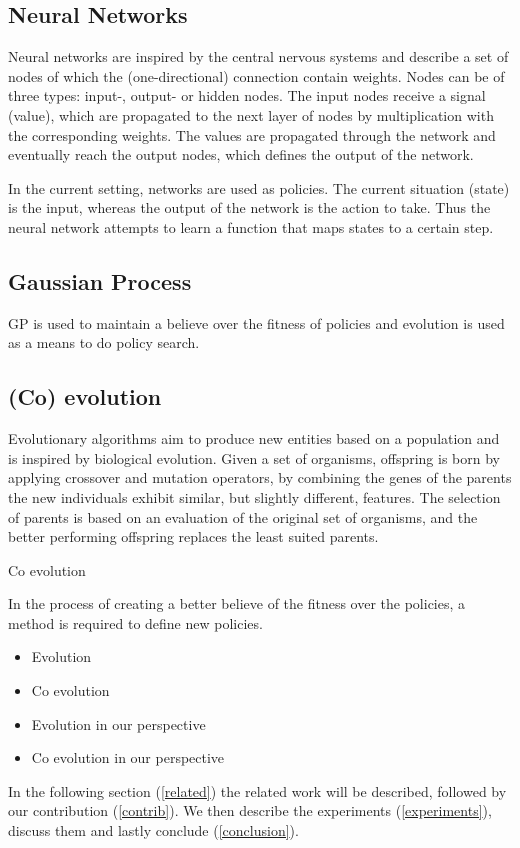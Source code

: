 \subsection{Neural Networks}
Neural networks are inspired by the central nervous systems and describe a set of nodes of which the (one-directional) connection contain weights. Nodes can be of three types: input-, output- or hidden nodes. The input nodes receive a signal (value), which are propagated to the next layer of nodes by multiplication with the corresponding weights. The values are propagated through the network and eventually reach the output nodes, which defines the output of the network. 

In the current setting, networks are used as policies. The current situation (state) is the input, whereas the output of the network is the action to take. Thus the neural network attempts to learn a function that maps states to a certain step.

\subsection{Gaussian Process}

GP is used to maintain a believe over the fitness of policies and evolution is used as a means to do policy search.

\subsection{(Co) evolution}
Evolutionary algorithms aim to produce new entities based on a population and is inspired by biological evolution. Given a set of organisms, offspring is born by applying crossover and mutation operators, by combining the genes of the parents the new individuals exhibit similar, but slightly different, features. The selection of parents is based on an evaluation of the original set of organisms, and the better performing offspring replaces the least suited parents. 

Co evolution 

In the process of creating a better believe of the fitness over the policies, a method is required to define new policies.


\begin{itemize}
  \item{Evolution}
  \item{Co evolution}
  \item{Evolution in our perspective}
  \item{Co evolution in our perspective}
\end{itemize}

In the following section (\ref{related}) the related work will be described, followed by our contribution (\ref{contrib}). We then describe the experiments (\ref{experiments}), discuss them and lastly conclude (\ref{conclusion}).

